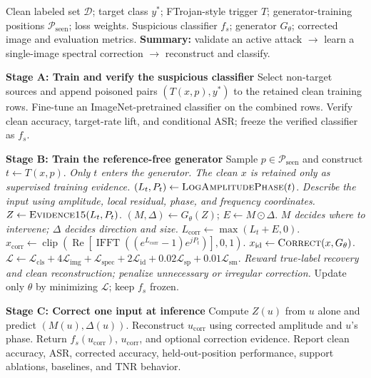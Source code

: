 \documentclass[10pt]{article}
\begin{document}
\begin{algorithm}[t]
\caption{Reference-Free Selective Spectral Correction}
\label{alg:reference-free-spectral-correction}
\begin{algorithmic}[1]
\Require Clean labeled set $\mathcal{D}$; target class $y^*$; FTrojan-style
trigger $T$; generator-training positions $\mathcal{P}_{\mathrm{seen}}$; loss weights.
\Ensure Suspicious classifier $f_s$; generator $G_\theta$; corrected image and
evaluation metrics.
\Statex \textbf{Summary:} validate an active attack $\rightarrow$ learn a
single-image spectral correction $\rightarrow$ reconstruct and classify.

\Statex \textbf{Stage A: Train and verify the suspicious classifier}
\State Select non-target sources and append poisoned pairs $(T(x,p),y^*)$ to
the retained clean training rows.
\State Fine-tune an ImageNet-pretrained classifier on the combined rows.
\State Verify clean accuracy, target-rate lift, and conditional ASR; freeze
the verified classifier as $f_s$.

\Statex \textbf{Stage B: Train the reference-free generator}
    \State Sample $p\in\mathcal{P}_{\mathrm{seen}}$ and construct $t\gets T(x,p)$.
    \Statex \emph{Only $t$ enters the generator. The clean $x$ is retained
    only as supervised training evidence.}
    \State $(L_t,P_t)\gets\Call{LogAmplitudePhase}{t}$.
    \Statex \emph{Describe the input using amplitude, local residual, phase,
    and frequency coordinates.}
    \State $Z\gets\Call{Evidence15}{L_t,P_t}$.
    \State $(M,\Delta)\gets G_\theta(Z)$; \quad $E\gets M\odot\Delta$.
    \Statex \emph{$M$ decides where to intervene; $\Delta$ decides direction
    and size.}
    \State $L_{\mathrm{corr}}\gets\max(L_t+E,0)$.
    \State $x_{\mathrm{corr}}\gets\operatorname{clip}\!\left(\operatorname{Re}
    [\operatorname{IFFT}((e^{L_{\mathrm{corr}}}-1)e^{jP_t})],0,1\right)$.
    \State $x_{\mathrm{id}}\gets\Call{Correct}{x,G_\theta}$.
    \State $\mathcal{L}\gets\mathcal{L}_{\mathrm{cls}}+4\mathcal{L}_{\mathrm{img}}
    +\mathcal{L}_{\mathrm{spec}}+2\mathcal{L}_{\mathrm{id}}
    +0.02\mathcal{L}_{\mathrm{sp}}+0.01\mathcal{L}_{\mathrm{sm}}$.
    \Statex \emph{Reward true-label recovery and clean reconstruction;
    penalize unnecessary or irregular correction.}
    \State Update only $\theta$ by minimizing $\mathcal{L}$; keep $f_s$ frozen.
\EndFor

\Statex \textbf{Stage C: Correct one input at inference}
    \State Compute $Z(u)$ from $u$ alone and predict $(M(u),\Delta(u))$.
    \State Reconstruct $u_{\mathrm{corr}}$ using corrected amplitude and $u$'s phase.
    \State Return $f_s(u_{\mathrm{corr}})$, $u_{\mathrm{corr}}$, and optional correction evidence.
\EndFor
\State Report clean accuracy, ASR, corrected accuracy, held-out-position
performance, support ablations, baselines, and TNR behavior.
\end{algorithmic}
\end{algorithm}
\end{document}
